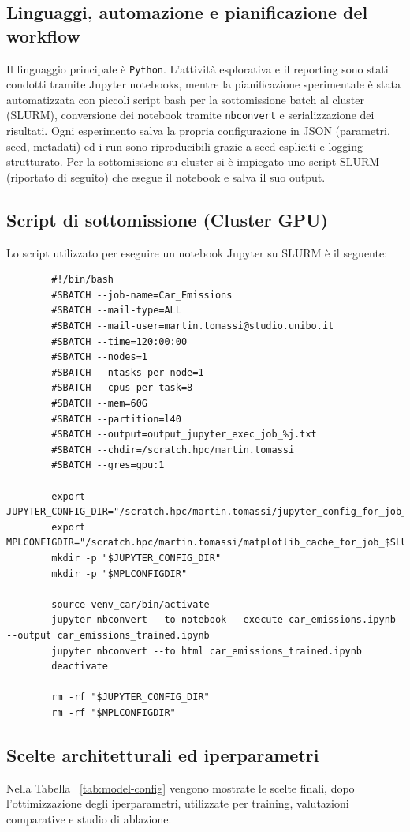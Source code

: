 \documentclass[a4paper,12pt]{report}
\begin{document}
	\subsection{Linguaggi, automazione e pianificazione del workflow}
	Il linguaggio principale è \texttt{Python}. L'attività esplorativa e il reporting sono stati condotti tramite Jupyter notebooks, mentre la pianificazione sperimentale è stata automatizzata con piccoli script bash per la sottomissione batch al cluster (SLURM), conversione dei notebook tramite \texttt{nbconvert} e serializzazione dei risultati. Ogni esperimento salva la propria configurazione in JSON (parametri, seed, metadati) ed i run sono riproducibili grazie a seed espliciti e logging strutturato. Per la sottomissione su cluster si è impiegato uno script SLURM (riportato di seguito) che esegue il notebook e salva il suo output.
	
	\subsection{Script di sottomissione (Cluster GPU)}
	Lo script utilizzato per eseguire un notebook Jupyter su SLURM è il seguente:
	
	\begin{verbatim}
		#!/bin/bash
		#SBATCH --job-name=Car_Emissions
		#SBATCH --mail-type=ALL
		#SBATCH --mail-user=martin.tomassi@studio.unibo.it
		#SBATCH --time=120:00:00
		#SBATCH --nodes=1
		#SBATCH --ntasks-per-node=1
		#SBATCH --cpus-per-task=8
		#SBATCH --mem=60G
		#SBATCH --partition=l40
		#SBATCH --output=output_jupyter_exec_job_%j.txt
		#SBATCH --chdir=/scratch.hpc/martin.tomassi
		#SBATCH --gres=gpu:1
		
		export JUPYTER_CONFIG_DIR="/scratch.hpc/martin.tomassi/jupyter_config_for_job_$SLURM_JOB_ID"
		export MPLCONFIGDIR="/scratch.hpc/martin.tomassi/matplotlib_cache_for_job_$SLURM_JOB_ID"
		mkdir -p "$JUPYTER_CONFIG_DIR"
		mkdir -p "$MPLCONFIGDIR"
		
		source venv_car/bin/activate
		jupyter nbconvert --to notebook --execute car_emissions.ipynb --output car_emissions_trained.ipynb
		jupyter nbconvert --to html car_emissions_trained.ipynb
		deactivate
		
		rm -rf "$JUPYTER_CONFIG_DIR"
		rm -rf "$MPLCONFIGDIR"
	\end{verbatim}
	
	\subsection{Scelte architetturali ed iperparametri}
	Nella Tabella ~\ref{tab:model-config} vengono mostrate le scelte finali, dopo l'ottimizzazione degli iperparametri, utilizzate per training, valutazioni comparative e studio di ablazione.
	
\end{document}
